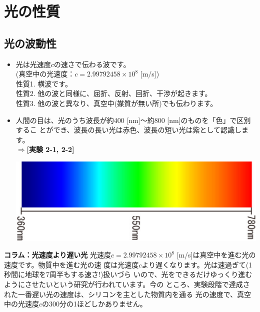 %
%


\section{光の性質}

\subsection{光の波動性}

\begin{itemize}

\item 光は光速度$c$の速さで伝わる波です。\\
(真空中の光速度：$c=2.99792458\times 10^8$ [m/s])\\
性質1. 横波です。\\
性質2. 他の波と同様に、屈折、反射、回折、干渉が起きます。\\
性質3. 他の波と異なり、真空中(媒質が無い所)でも伝わります。

\item 人間の目は、光のうち波長が約400 [nm]〜約800 [nm]のものを「色」で区別するこ
とができ、波長の長い光は赤色、波長の短い光は紫として認識します。\\
$\Rightarrow${\bf [実験 2-1, 2-2]}

\begin{center}
\includegraphics[scale=0.6, bb=0 0 660 218]{02_Refraction/spectrum.pdf}
\end{center}

\end{itemize}



\bigskip

\begin{itembox}[l]{\bf コラム：光速度より遅い光}
光速度$c=2.99792458\times 10^8$ [m/s]は真空中を進む光の速度です。物質中を進む光の速 
度は光速度$c$より遅くなります。光は速過ぎて(1秒間に地球を7周半もする速さ!)扱いづら 
いので、光をできるだけゆっくり進むようにさせたいという研究が行われています。今の 
ところ、実験段階で達成された一番遅い光の速度は、シリコンを主とした物質内を通る 
光の速度で、真空中の光速度$c$の300分の1ほどしかありません。
\end{itembox}

